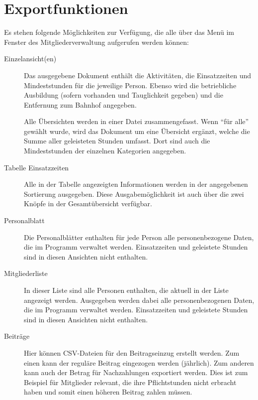 \section{Exportfunktionen}
Es stehen folgende Möglichkeiten zur Verfügung,
die alle über das Menü  im Fenster des Mitgliederverwaltung aufgerufen werden können:
\begin{description}
  \item[Einzelansicht(en)]
  Das ausgegebene Dokument enthält die Aktivitäten, die Einsatzzeiten und Mindeststunden für die jeweilige Person.
  Ebenso wird die betriebliche Ausbildung (sofern vorhanden und Tauglichkeit gegeben) und die Entfernung zum Bahnhof angegeben.

  Alle Übersichten werden in einer Datei zusammengefasst.
  Wenn \enquote{für alle} gewählt wurde,
  wird das Dokument um eine Übersicht ergänzt,
  welche die Summe aller geleisteten Stunden umfasst.
  Dort sind auch die Mindeststunden der einzelnen Kategorien angegeben.

  \item[Tabelle Einsatzzeiten]
  Alle in der Tabelle angezeigten Informationen werden in der angegebenen Sortierung ausgegeben.
  Diese Ausgabemöglichkeit ist auch über die zwei Knöpfe in der Gesamtübersicht verfügbar.

  \item[Personalblatt]
  Die Personalblätter enthalten für jede Person alle personenbezogene Daten,
  die im Programm verwaltet werden.
  Einsatzzeiten und geleistete Stunden sind in diesen Ansichten nicht enthalten.

  \item[Mitgliederliste]
  In dieser Liste sind alle Personen enthalten, die aktuell in der Liste angezeigt werden.
  Ausgegeben werden dabei alle personenbezogenen Daten,
  die im Programm verwaltet werden.
  Einsatzzeiten und geleistete Stunden sind in diesen Ansichten nicht enthalten.

  \item[Beiträge]
  \begin{neu}
  Hier können CSV-Dateien für den Beitragseinzug erstellt werden.
  Zum einen kann der reguläre Beitrag eingezogen werden (jährlich).
  Zum anderen kann auch der Betrag für Nachzahlungen exportiert werden.
  Dies ist zum Beispiel für Mitglieder relevant,
  die ihre Pflichtstunden nicht erbracht haben
  und somit einen höheren Beitrag zahlen müssen.
  \end{neu}
\end{description}
